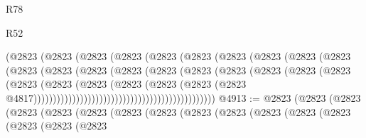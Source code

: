 \begin{lexlean}{R78}
\begin{lexlean}{R52}
\begin{coremodule}
{{{{{{{{{{{{{{{{{{{{{{{{{{{{{{{{{{{{{{{{{{{{{{{{{{{{{{{{{{{{{{{{{{{{{{{{{{{{{{{{{{{{{{{{{{{{{{{{{{{{{{{{{{{{{{{{{{{{{{{{{{{{{{{{{{{{{{{{{{{{{{{{{{{{{{{{{{{{{{{{{{{{{{{{{{{{{{{{{{{{{{{{{{{{{{{{{{{{{{                                            (@2823
                                              (@2823
                                                (@2823
                                                  (@2823
                                                    (@2823
                                                      (@2823
                                                        (@2823
                                                          (@2823
                                                            (@2823
                                                              (@2823
                                                                (@2823
                                                                  (@2823
                                                                    (@2823
                                                                      (@2823
                                                                        (@2823
                                                                          (@2823
                                                                            (@2823
                                                                              (@2823
                                                                                (@2823
                                                                                  (@2823
                                                                                    (@2823
                                                                                      (@2823
                                                                                        (@2823
                                                                                          (@2823
                                                                                            (@2823
                                                                                              (@2823
                                                                                                (@2823
                                                                                                  @4817)))))))))))))))))))))))))))))))))))))))))))))))
@4913 := @2823
    (@2823
      (@2823
        (@2823
          (@2823
            (@2823
              (@2823
                (@2823
                  (@2823
                    (@2823
                      (@2823
                        (@2823
                          (@2823
                            (@2823
                              (@2823
                                (@2823
}}}}}}}}}}}}}}}}}}}}}}}}}}}}}}}}}}}}}}}}}}}}}}}}}}}}}}}}}}}}}}}}}}}}}}}}}}}}}}}}}}}}}}}}}}}}}}}}}}}}}}}}}}}}}}}}}}}}}}}}}}}}}}}}}}}}}}}}}}}}}}}}}}}}}}}}}}}}}}}}}}}}}}}}}}}}}}}}}}}}}}}}}}}}}}}}}}}}}}
\end{coremodule}
\end{lexlean}
\end{lexlean}

